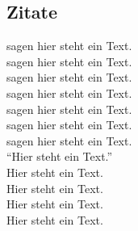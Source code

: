 \subsection{Zitate}

\cite{Google13} sagen hier steht ein Text. \\
\citet{Hidayat13} sagen hier steht ein Text. \\
\citet*{Yahoo13} sagen hier steht ein Text. \\
\citet*{Trostler13} sagen hier steht ein Text. \\
\citet*{Wiki13-01} sagen hier steht ein Text. \\
\citet*{Wiki13-02} sagen hier steht ein Text. \\
\citet*{Wiki13-03} sagen hier steht ein Text. \\
"`Hier steht ein Text."' \citep{Johansen10} \\
Hier steht ein Text. \citep[Vgl.][]{Kleivane11} \\
Hier steht ein Text. \citep[][S. 200]{Koch01} \\
Hier steht ein Text. \citep*[][S. 200]{Pivotal13} \\
Hier steht ein Text. \citep{Selenium13,Nguyen13} \\


